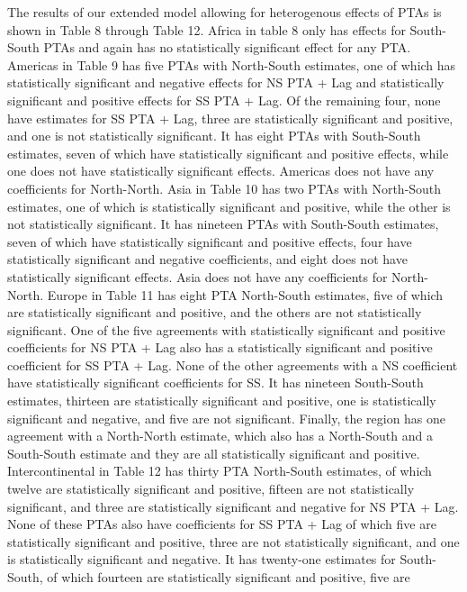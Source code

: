 The results of our extended model allowing for heterogenous effects of
PTAs is shown in Table 8 through Table 12. Africa in table 8 only has
effects for South-South PTAs and again has no statistically significant
effect for any PTA. Americas in Table 9 has five PTAs with North-South
estimates, one of which has statistically significant and negative
effects for NS PTA + Lag and statistically significant and positive
effects for SS PTA + Lag. Of the remaining four, none have estimates for
SS PTA + Lag, three are statistically significant and positive, and one
is not statistically significant. It has eight PTAs with South-South
estimates, seven of which have statistically significant and positive
effects, while one does not have statistically significant effects.
Americas does not have any coefficients for North-North. Asia in Table
10 has two PTAs with North-South estimates, one of which is
statistically significant and positive, while the other is not
statistically significant. It has nineteen PTAs with South-South
estimates, seven of which have statistically significant and positive
effects, four have statistically significant and negative coefficients,
and eight does not have statistically significant effects. Asia does not
have any coefficients for North-North. Europe in Table 11 has eight PTA
North-South estimates, five of which are statistically significant and
positive, and the others are not statistically significant. One of the
five agreements with statistically significant and positive coefficients
for NS PTA + Lag also has a statistically significant and positive
coefficient for SS PTA + Lag. None of the other agreements with a NS
coefficient have statistically significant coefficients for SS. It has
nineteen South-South estimates, thirteen are statistically significant
and positive, one is statistically significant and negative, and five
are not significant. Finally, the region has one agreement with a
North-North estimate, which also has a North-South and a South-South
estimate and they are all statistically significant and positive.
Intercontinental in Table 12 has thirty PTA North-South estimates, of
which twelve are statistically significant and positive, fifteen are not
statistically significant, and three are statistically significant and
negative for NS PTA + Lag. None of these PTAs also have coefficients for
SS PTA + Lag of which five are statistically significant and positive,
three are not statistically significant, and one is statistically
significant and negative. It has twenty-one estimates for South-South,
of which fourteen are statistically significant and positive, five are
